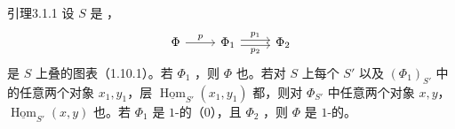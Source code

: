 \begin{SGAresult}{引理}{3.1.1}
设 $S$ 是 ，
\[
\begin{tikzcd}
\Phi\arrow[r,"p"]&\Phi_1\arrow[r,shift left=.5ex,"p_1"]\arrow[r,shift right=.5ex,"p_2"']&\Phi_2
\end{tikzcd}
\]
是 $S$ 上叠的图表（1.10.1）。若 $\Phi_1$ ，则 $\Phi$ 也。若对 $S$ 上每个 $S'$ 以及 $(\Phi_1)_{S'}$ 中的任意两个对象 $x_1,y_1$，层 $\underline{\operatorname{Hom}}_{S'}(x_1,y_1)$ 都，则对 $\Phi_{S'}$ 中任意两个对象 $x,y$，$\underline{\operatorname{Hom}}_{S'}(x,y)$ 也。若 $\Phi_1$ 是 $1$-的（0），且 $\Phi_2$ ，则 $\Phi$ 是 $1$-的。
\end{SGAresult}
